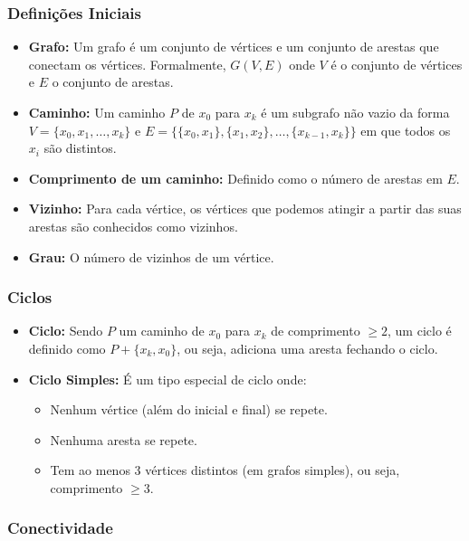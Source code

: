 \subsubsection{Definições Iniciais}

\begin{itemize}\setlength\itemsep{0pt}
    \item \textbf{Grafo:} Um grafo é um conjunto de vértices e um conjunto de arestas que conectam os vértices. Formalmente, $G(V, E)$ onde $V$ é o conjunto de vértices e $E$ o conjunto de arestas.
    \item \textbf{Caminho:} Um caminho $P$ de $x_0$ para $x_k$ é um subgrafo não vazio da forma $V = \{x_0, x_1, \dots, x_k\}$ e $E = \{\{x_0, x_1\}, \{x_1, x_2\}, \dots, \{x_{k-1}, x_k\}\}$ em que todos os $x_i$ são distintos.
    \item \textbf{Comprimento de um caminho:} Definido como o número de arestas em $E$.
    \item \textbf{Vizinho:} Para cada vértice, os vértices que podemos atingir a partir das suas arestas são conhecidos como vizinhos.
    \item \textbf{Grau:} O número de vizinhos de um vértice.
\end{itemize}

\subsubsection{Ciclos}

\begin{itemize}\setlength\itemsep{0pt}
    \item \textbf{Ciclo:} Sendo $P$ um caminho de $x_0$ para $x_k$ de comprimento $\ge 2$, um ciclo é definido como $P + \{x_k, x_0\}$, ou seja, adiciona uma aresta fechando o ciclo.
    \item \textbf{Ciclo Simples:} É um tipo especial de ciclo onde:
    \begin{itemize}\setlength\itemsep{0pt}
        \item Nenhum vértice (além do inicial e final) se repete.
        \item Nenhuma aresta se repete.
        \item Tem ao menos 3 vértices distintos (em grafos simples), ou seja, comprimento $\ge 3$.
    \end{itemize}
\end{itemize}

\subsubsection{Conectividade}

